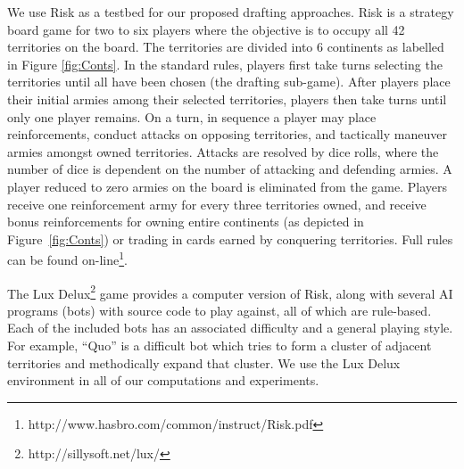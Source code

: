 \documentclass[letterpaper]{article}
\numberwithin{equation}{section}
\numberwithin{theorem}{section}
\numberwithin{lemma}{section}
\numberwithin{df}{section}
\begin{document}
We use Risk as a testbed for our proposed drafting approaches.  Risk is a strategy board game for two to six players where the objective is to occupy all 42 territories on the board.  The territories are divided into 6 continents as labelled in Figure \ref{fig:Conts}.  In the standard rules, players first take turns selecting the territories until all have been chosen (the drafting sub-game).  After players place their initial armies among their selected territories, players then take turns until only one player remains.  On a turn, in sequence a player may place reinforcements, conduct attacks on opposing territories, and tactically maneuver armies amongst owned territories.  Attacks are resolved by dice rolls, where the number of dice is dependent on the number of attacking and defending armies.  A player reduced to zero armies on the board is eliminated from the game.  Players receive one reinforcement army for every three territories owned, and receive bonus reinforcements for owning entire continents (as depicted in Figure~\ref{fig:Conts}) or trading in cards earned by conquering territories. Full rules can be found on-line\footnote{http://www.hasbro.com/common/instruct/Risk.pdf}.

The Lux Delux\footnote{http://sillysoft.net/lux/} game provides a computer version of Risk, along with several AI programs (bots) with source code to play against, all of which are rule-based.  Each of the included bots has an associated difficulty and a general playing style.  For example, ``Quo'' is a difficult bot which tries to form a cluster of adjacent territories and methodically expand that cluster.  We use the Lux Delux environment in all of our computations and experiments.
\end{document}
